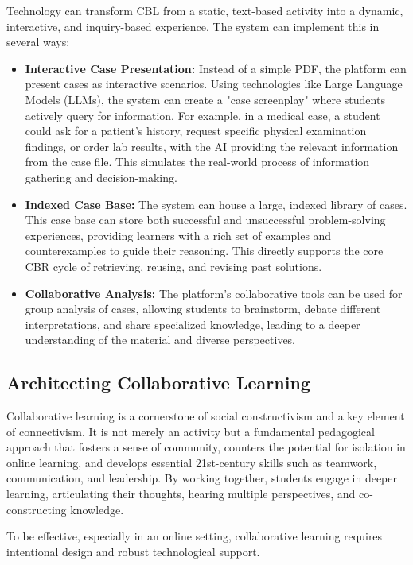 \documentclass{article}
\begin{document}
Technology can transform CBL from a static, text-based activity into a dynamic, interactive, and inquiry-based experience. The system can implement this in several ways:
\begin{itemize}
    \item \textbf{Interactive Case Presentation:} Instead of a simple PDF, the platform can present cases as interactive scenarios. Using technologies like Large Language Models (LLMs), the system can create a "case screenplay" where students actively query for information. For example, in a medical case, a student could ask for a patient's history, request specific physical examination findings, or order lab results, with the AI providing the relevant information from the case file.\cite{54, 56} This simulates the real-world process of information gathering and decision-making.
    \item \textbf{Indexed Case Base:} The system can house a large, indexed library of cases. This case base can store both successful and unsuccessful problem-solving experiences, providing learners with a rich set of examples and counterexamples to guide their reasoning.\cite{57} This directly supports the core CBR cycle of retrieving, reusing, and revising past solutions.
    \item \textbf{Collaborative Analysis:} The platform's collaborative tools can be used for group analysis of cases, allowing students to brainstorm, debate different interpretations, and share specialized knowledge, leading to a deeper understanding of the material and diverse perspectives.\cite{53}
\end{itemize}

\subsection{Architecting Collaborative Learning}

Collaborative learning is a cornerstone of social constructivism and a key element of connectivism. It is not merely an activity but a fundamental pedagogical approach that fosters a sense of community, counters the potential for isolation in online learning, and develops essential 21st-century skills such as teamwork, communication, and leadership.\cite{58, 59, 60} By working together, students engage in deeper learning, articulating their thoughts, hearing multiple perspectives, and co-constructing knowledge.\cite{59, 60}

To be effective, especially in an online setting, collaborative learning requires intentional design and robust technological support.
\end{document}
